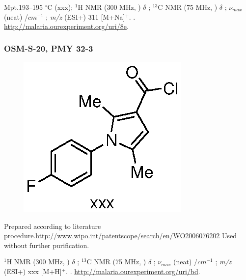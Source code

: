 \documentclass[12pt, a4paper,titlepage]{article}
\begin{document}
{%
Mpt.193--195 $^\circ$C (xxx); 
$^1$H NMR (300 MHz, ) $\delta$ ; 
  $^{13}$C NMR (75 MHz, ) $\delta$ ; 
 $\nu_{max}$ (neat) /$cm^{-1}$ ; 
\emph{m/z} (ESI+) 311 [M+Na]$^+$.
. 
\url{http://malaria.ourexperiment.org/uri/8e}. 

\subsubsection*{OSM-S-20, PMY 32-3}
\label{exp:PMY32}
	\begin{figure}[H]
	\begin{center}
	\includegraphics{exp/PMY32.eps}
	\end{center}
	\vspace{-25pt}	
	\end{figure}	

Prepared according to literature procedure.\url{http://www.wipo.int/patentscope/search/en/WO2006076202}
Used without further purification.

$^1$H NMR (300 MHz, ) $\delta$ ; 
  $^{13}$C NMR (75 MHz, ) $\delta$ ; 
 $\nu_{max}$ (neat) /$cm^{-1}$ ; 
\emph{m/z} (ESI+) xxx [M+H]$^+$.
. 
\url{http://malaria.ourexperiment.org/uri/bd}. 

}
\end{document}
